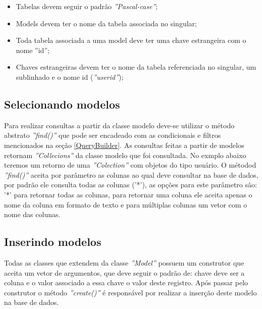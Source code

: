 \begin{itemize}
\item Tabelas devem seguir o padrão \textit{''Pascal-case''};
    \item Models devem ter o nome da tabela associada no singular;
    \item Toda tabela associada a uma model deve ter uma chave estrangeira com o nome ''id'';
    \item Chaves estrangeiras devem ter o nome da tabela referenciada no singular, um sublinhado e o nome id (\textit{''user\textunderscore{ }id''});
\end{itemize}

\subsection{Selecionando modelos}

Para realizar consultas a partir da classe modelo deve-se utilizar o método abstrato \textit{''find()''} que pode ser encadeado com as condicionais e filtros mencionados na seção \ref{QueryBuilder}. As consultas feitas a partir de modelos retornam \textit{''Collecions''} da classe modelo que foi consultada. No exmplo abaixo teremos um retorno de uma \textit{''Colection''} com objetos do tipo usuário. O métodod \textit{''find()''} aceita por parâmetro as colunas ao qual deve consultar na base de dados, por padrão ele consulta todas as colunas ('*'), as opções para este parâmetro são: '*' para retornar todas as colunas, para retornar uma coluna ele aceita apenas o nome da coluna em formato de texto e para múltiplas colunas um vetor com o nome das colunas.

\spaceH{}

\label{scripts/model_select.php}

\subsection{Inserindo modelos}

Todas as classes que extendem da classe \textit{''Model''} possuem um construtor que aceita um vetor de argumentos, que deve seguir o padrão de: chave deve ser a coluna e o valor associado a essa chave o valor deste registro. Após passar pelo construtor o método \textit{''create()''} é responsável por realizar a inserção deste modelo na base de dados.

\spaceH{}

\label{scripts/model_insert.php}

